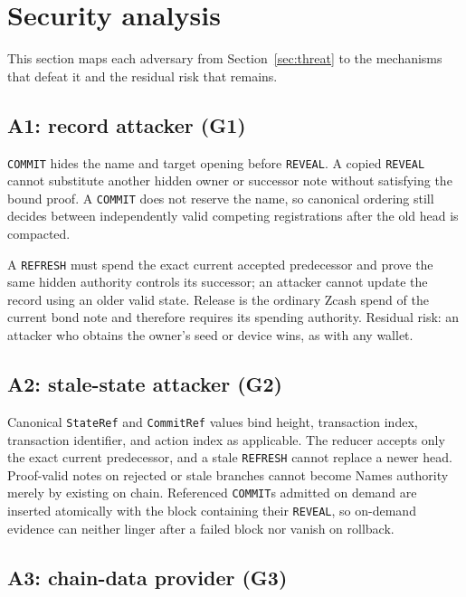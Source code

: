 \documentclass[11pt]{article}
\newcommand{\operation}[1]{\texttt{#1}}
\newcommand{\code}[1]{\texttt{#1}}
\begin{document}
\section{Security analysis}
\label{sec:security}

This section maps each adversary from Section~\ref{sec:threat} to the
mechanisms that defeat it and the residual risk that remains.

\subsection{A1: record attacker (G1)}

\operation{COMMIT} hides the name and target opening before
\operation{REVEAL}. A copied \operation{REVEAL} cannot substitute another
hidden owner or successor note without satisfying the bound proof. A
\operation{COMMIT} does not reserve the name, so canonical ordering still
decides between independently valid competing registrations after the old
head is compacted.

A \operation{REFRESH} must spend the exact current accepted predecessor and
prove the same hidden authority controls its successor; an attacker cannot
update the record using an older valid state. Release is the ordinary Zcash
spend of the current bond note and therefore requires its spending authority.
Residual risk: an attacker who obtains the owner's seed or device wins, as
with any wallet.

\subsection{A2: stale-state attacker (G2)}

Canonical \code{StateRef} and \code{CommitRef} values bind height,
transaction index, transaction identifier, and action index as applicable.
The reducer accepts only the exact current predecessor, and a stale
\operation{REFRESH} cannot replace a newer head. Proof-valid notes on
rejected or stale branches cannot become Names authority merely by existing
on chain. Referenced \operation{COMMIT}s admitted on demand are inserted
atomically with the block containing their \operation{REVEAL}, so on-demand
evidence can neither linger after a failed block nor vanish on rollback.

\subsection{A3: chain-data provider (G3)}
\end{document}
